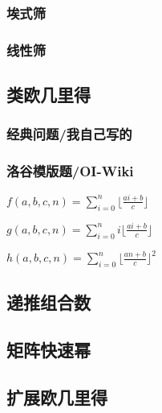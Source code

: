 \documentclass{article}
\begin{document}
\subsubsection{埃式筛}



\subsubsection{线性筛}



\subsection{类欧几里得}

\subsubsection{经典问题/我自己写的}



\subsubsection{洛谷模版题/OI-Wiki}
    
$f(a, b, c, n)=\sum_{i=0}^n \lfloor \frac{ai+b}{c} \rfloor$

$g(a, b, c, n)=\sum_{i=0}^n i \lfloor \frac{ai+b}{c} \rfloor$

$h(a, b, c, n)=\sum_{i=0}^n \lfloor \frac{an+b}{c} \rfloor ^2$



\subsection{递推组合数}



\subsection{矩阵快速幂} %



\subsection{扩展欧几里得} %
\end{document}
